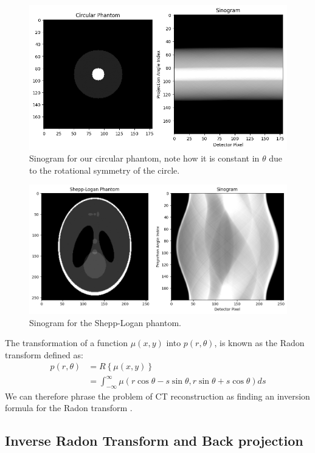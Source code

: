\documentclass{article}
\begin{document}
\begin{figure}[H]
	\includegraphics[scale=0.5]{sinogramcircle.png}
	\caption{Sinogram for our circular phantom, note how it is constant in $\theta$ due to the rotational symmetry of the circle.}
	\label{fig:sinogramcircle}
\end{figure}

\begin{figure}[H]
	\includegraphics[scale=0.5]{sinogramshepp.png}
	\caption{Sinogram for the Shepp-Logan phantom.}
	\label{fig:sinogramshepp}
\end{figure}

The transformation of a function $\mu (x,y)$ into $p(r, \theta)$, is known as the Radon transform defined as:
\begin{align}
p(r, \theta) &= R \left\{ \mu(x,y) \right\} \\
&= \int_{-\infty}^{\infty} \mu(r \cos\theta - s \sin\theta, r \sin\theta + s \cos\theta) ds
\end{align}
We can therefore phrase the problem of CT reconstruction as finding an inversion formula for the Radon transform \cite{Beatty2012}. 

\subsection{Inverse Radon Transform and Back projection}



\end{document}
